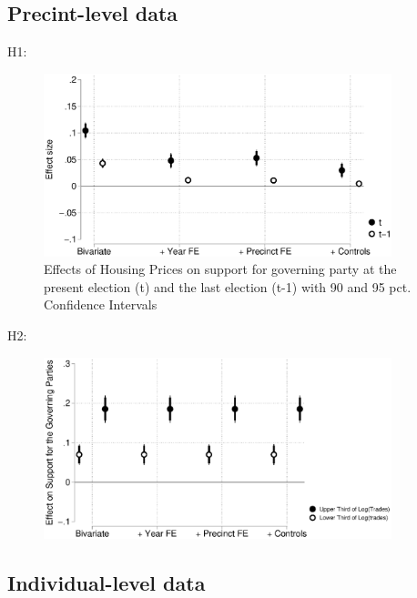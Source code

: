 \documentclass[10pt,aspectratio=169]{beamer}
\begin{document}
\subsection{Precint-level data}

\begin{frame}
H1:
\begin{figure}[htbp!]
	\includegraphics[width=0.9\textwidth]{../../figures/lagdv.eps}
	\centering
	\caption{Effects of Housing Prices on support for governing party at the present election (t) and the last election (t-1) with 90  and 95 pct. Confidence Intervals}\label{placebo}
\end{figure}
\end{frame}

\begin{frame}
H2: \\
\centering
\begin{figure}[htbp!]
	\includegraphics[width=0.9\textwidth]{../../figures/localactivity.eps}
\end{figure}
\end{frame}

\subsection{Individual-level data}
\end{document}
